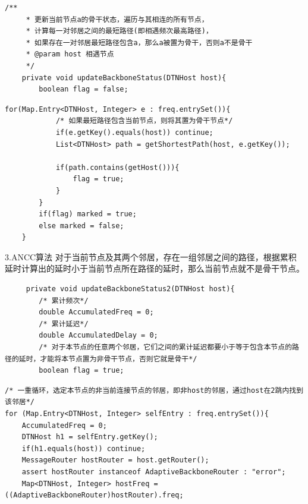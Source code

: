 \documentclass[12pt,aspectratio=43,table]{beamer}
\begin{document}
\begin{frame}[fragile]
\begin{lstlisting}
/**
     * 更新当前节点a的骨干状态，遍历与其相连的所有节点，
     * 计算每一对邻居之间的最短路径(即相遇频次最高路径)，
     * 如果存在一对邻居最短路径包含a，那么a被置为骨干，否则a不是骨干
     * @param host 相遇节点
     */
    private void updateBackboneStatus(DTNHost host){
        boolean flag = false;
\end{lstlisting}
\end{frame}

\begin{frame}[fragile]
\begin{lstlisting}
for(Map.Entry<DTNHost, Integer> e : freq.entrySet()){
            /* 如果最短路径包含当前节点，则将其置为骨干节点*/
            if(e.getKey().equals(host)) continue;
            List<DTNHost> path = getShortestPath(host, e.getKey());

            if(path.contains(getHost())){
                flag = true;
            }
        }
        if(flag) marked = true;
        else marked = false;
    }
\end{lstlisting}
\end{frame}

\begin{frame}[fragile]{\small3.ANCC算法}
对于当前节点及其两个邻居，存在一组邻居之间的路径，根据累积延时计算出的延时小于当前节点所在路径的延时，那么当前节点就不是骨干节点。
\begin{lstlisting}
     private void updateBackboneStatus2(DTNHost host){
        /* 累计频次*/
        double AccumulatedFreq = 0;
        /* 累计延迟*/
        double AccumulatedDelay = 0;
        /* 对于本节点的任意两个邻居，它们之间的累计延迟都要小于等于包含本节点的路径的延时，才能将本节点置为非骨干节点，否则它就是骨干*/
        boolean flag = true;
\end{lstlisting}
\end{frame}

\begin{frame}[fragile]
\begin{lstlisting}
/* 一重循环，选定本节点的非当前连接节点的邻居，即非host的邻居，通过host在2跳内找到该邻居*/
for (Map.Entry<DTNHost, Integer> selfEntry : freq.entrySet()){
    AccumulatedFreq = 0;
    DTNHost h1 = selfEntry.getKey();
    if(h1.equals(host)) continue;
    MessageRouter hostRouter = host.getRouter();
    assert hostRouter instanceof AdaptiveBackboneRouter : "error";
    Map<DTNHost, Integer> hostFreq = ((AdaptiveBackboneRouter)hostRouter).freq;
\end{lstlisting}
\end{frame}
\end{document}
